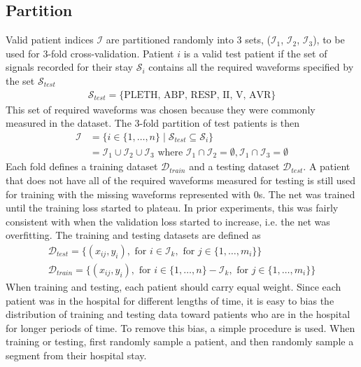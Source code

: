 \subsection{Partition}

Valid patient indices $\mathcal{I}$ are partitioned randomly into 3 sets, ($\mathcal{I}_1$, $\mathcal{I}_2$, $\mathcal{I}_3$), to be used for 3-fold cross-validation.  Patient $i$ is a valid test patient if the set of signals recorded for their stay $\mathcal{S}_i$ contains all the required waveforms specified by the set $\mathcal{S}_{test}$
\begin{gather}
    \mathcal{S}_{test} = \{ \text{PLETH, ABP, RESP, II, V, AVR} \}
\end{gather}
This set of required waveforms was chosen because they were commonly measured in the dataset.  The 3-fold partition of test patients is then
\begin{align}
    \mathcal{I} 
        &= \{
            i \in \{1, \dots, n\} \mid 
            \mathcal{S}_{test} \subseteq \mathcal{S}_i
        \} \\
        &= \mathcal{I}_1 \cup \mathcal{I}_2 \cup \mathcal{I}_3 \text{ where }
            \mathcal{I}_1 \cap \mathcal{I}_2 = \emptyset, \mathcal{I}_1 \cap \mathcal{I}_3 = \emptyset
\end{align}
Each fold defines a training dataset $\mathcal{D}_{train}$ and a testing dataset $\mathcal{D}_{test}$.  A patient that does not have all of the required waveforms measured for testing is still used for training with the missing waveforms represented with 0s.  The net was trained until the training loss started to plateau.  In prior experiments, this was fairly consistent with when the validation loss started to increase, i.e. the net was overfitting. The training and testing datasets are defined as
\begin{gather}
    \mathcal{D}_{test} = \{
        (x_{ij}, y_i),
        \text{ for } i \in \mathcal{I}_k,
        \text{ for } j \in \{ 1, \dots, m_i \}
    \} \\
    \mathcal{D}_{train} = \{
        (x_{ij}, y_i),
        \text{ for } i \in \{1, \dots, n\} - \mathcal{I}_k,
        \text{ for } j \in \{ 1, \dots, m_i \}
    \}
\end{gather}
When training and testing, each patient should carry equal weight.  Since each patient was in the hospital for different lengths of time, it is easy to bias the distribution of training and testing data toward patients who are in the hospital for longer periods of time.  To remove this bias, a simple procedure is used.  When training or testing, first randomly sample a patient, and then randomly sample a segment from their hospital stay.
